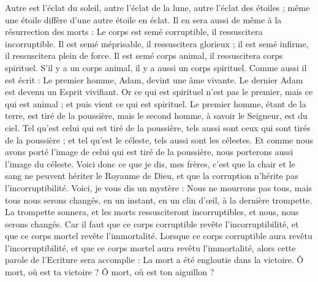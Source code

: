 \begin{multicols}{2}
Autre est l’éclat du soleil, autre l’éclat de la lune, autre l’éclat des étoiles ; même une étoile diffère d'une autre étoile en éclat.
Il en sera aussi de même à la résurrection des morts : Le corps est semé corruptible, il ressuscitera incorruptible.
Il est semé méprisable, il ressuscitera glorieux ; il est semé infirme, il ressuscitera plein de force.
Il est semé corps animal, il ressuscitera corps spirituel. S’il y a un corps animal, il y a aussi un corps spirituel.
Comme aussi il est écrit : Le premier homme, Adam, devint une âme vivante. Le dernier Adam est devenu un Esprit vivifiant.
Or ce qui est spirituel n'est pas le premier, mais ce qui est animal ; et puis vient ce qui est spirituel.
Le premier homme, étant de la terre, est tiré de la poussière, mais le second homme, à savoir le Seigneur, est du ciel.
Tel qu'est celui qui est tiré de la poussière, tels aussi sont ceux qui sont tirés de la poussière ; et tel qu'est le céleste, tels aussi sont les célestes.
Et comme nous avons porté l'image de celui qui est tiré de la poussière, nous porterons aussi l'image du céleste.
Voici donc ce que je dis, mes frères, c'est que la chair et le sang ne peuvent hériter le Royaume de Dieu, et que la corruption n'hérite pas l'incorruptibilité.
Voici, je vous dis un mystère : Nous ne mourrons pas tous, mais tous nous serons changés,
en un instant, en un clin d’œil, à la dernière trompette. La trompette sonnera, et les morts ressusciteront incorruptibles, et nous, nous serons changés.
Car il faut que ce corps corruptible revête l'incorruptibilité, et que ce corps mortel revête l'immortalité.
Lorsque ce corps corruptible aura revêtu l'incorruptibilité, et que ce corps mortel aura revêtu l'immortalité, alors cette parole de l'Ecriture sera accomplie : La mort a été engloutie dans la victoire.
Ô mort, où est ta victoire ? Ô mort, où est ton aiguillon ?

\end{multicols}
